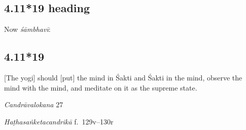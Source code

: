 \begin{ekdosis}


\subsection*{4.11*19 heading}
\begin{translation}[hp04_011_19a]
Now \emph{śāmbhavī}:
\end{translation}


\subsection*{4.11*19}
\begin{translation}[hp04_011_19]
{[}The yogi] should [put] the mind in Śakti and Śakti in the mind, observe the mind with the mind, and meditate on it as the supreme state.
\end{translation}


\begin{sources}[hp04_011_19]
\emph{Candrāvalokana} 27
\begin{versinnote}
\tl{\var{madhyamam ] madhyagaṃ 4340}\\+}
\tl{\var{taṃ dhyāyet ] tad dhyāyet 4340}\\!}
\end{versinnote}
\end{sources}

\begin{testimonia}[hp04_011_19]
\emph{Haṭhasaṅketacandrikā} f.~129v–130r
\begin{versinnote}
\end{versinnote}
\end{testimonia}


\end{ekdosis}
